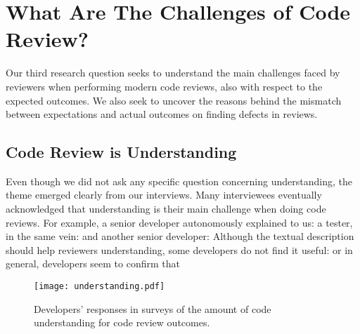 
\section{What Are The Challenges of Code Review?} \label{sec:challenges}


Our third research question seeks to understand the main challenges faced by reviewers when performing modern code reviews, also with respect to the expected outcomes. We also seek to uncover the reasons behind the mismatch between expectations and actual outcomes on finding defects in reviews.


\subsection{Code Review is Understanding}

Even though we did not ask any specific question concerning understanding, the theme emerged clearly from our interviews. Many interviewees eventually acknowledged that understanding is their main challenge when doing code reviews. For example, a senior developer autonomously explained to us:  a tester, in the same vein:  and another senior developer:  Although the textual description should help reviewers understanding, some developers do not find it useful:  or  in general, developers seem to confirm that 

\begin{figure}[t] %
   \centering
   \texttt{[image: understanding.pdf]}
   \vspace{-1.5em}
   \caption{Developers' responses in surveys of the amount of code understanding for code review outcomes.}
   \label{fig:understanding}
   \vspace{-1.5em}
\end{figure}

